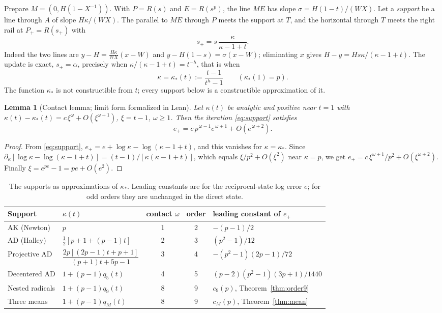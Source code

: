 \documentclass[10pt,a4paper]{article}
\theoremstyle{plain}
\newtheorem{lemma}[theorem]{Lemma}
\theoremstyle{remark}
\numberwithin{equation}{section}
\begin{document}
Prepare $M=(0,H(1-X^{-1}))$. With $P=R(s)$ and $E=R(s^{p})$, the line $ME$ has slope
$\sigma=H(1-t)/(WX)$. Let a \emph{support} be a line through $A$ of slope $H\kappa/(WX)$. The parallel
to $ME$ through $P$ meets the support at $T$, and the horizontal through $T$ meets the right rail at
$P_+=R(s_+)$ with
\begin{equation}\label{eq:support}
s_+=s\,\frac{\kappa}{\kappa-1+t}.
\end{equation}
Indeed the two lines are $y-H=\tfrac{H\kappa}{WX}(x-W)$ and $y-H(1-s)=\sigma(x-W)$; eliminating $x$
gives $H-y=Hs\kappa/(\kappa-1+t)$. The update is exact, $s_+=\alpha$, precisely when
$\kappa/(\kappa-1+t)=t^{-h}$, that is when
\begin{equation}\label{eq:kstar}
\kappa=\kappa_*(t):=\frac{t-1}{t^{h}-1}\qquad(\kappa_*(1)=p).
\end{equation}
The function $\kappa_*$ is not constructible from $t$; every support below is a constructible
approximation of it.

\begin{lemma}[Contact lemma; limit form formalized in Lean]\label{lem:contact}
Let $\kappa(t)$ be analytic and positive near $t=1$ with
$\kappa(t)-\kappa_*(t)=c\,\xi^{\omega}+O(\xi^{\omega+1})$, $\xi=t-1$, $\omega\ge1$. Then the iteration
\eqref{eq:support} satisfies
\[ e_+=c\,p^{\,\omega-1}e^{\,\omega+1}+O(e^{\,\omega+2}). \]
\end{lemma}
\begin{proof}
From \eqref{eq:support}, $e_+=e+\log\kappa-\log(\kappa-1+t)$, and this vanishes for
$\kappa=\kappa_*$. Since $\partial_\kappa[\log\kappa-\log(\kappa-1+t)]=(t-1)/[\kappa(\kappa-1+t)]$,
which equals $\xi/p^{2}+O(\xi^{2})$ near $\kappa=p$, we get
$e_+=c\,\xi^{\omega+1}/p^{2}+O(\xi^{\omega+2})$. Finally $\xi=e^{pe}-1=pe+O(e^{2})$.
\end{proof}

\begin{table}[h]
\centering\small
\caption{The supports as approximations of $\kappa_*$. Leading constants are for the reciprocal-state
log error $e$; for odd orders they are unchanged in the direct state.}\label{tab:supports}
\begin{tabular}{@{}llccl@{}}
\toprule
Support & $\kappa(t)$ & contact $\omega$ & order & leading constant of $e_+$\\
\midrule
AK (Newton) & $p$ & 1 & 2 & $-(p-1)/2$\\[2pt]
AD (Halley) & $\tfrac12[p+1+(p-1)t]$ & 2 & 3 & $(p^{2}-1)/12$\\[2pt]
Projective AD & $\dfrac{2p[(2p-1)t+p+1]}{(p+1)t+5p-1}$ & 3 & 4 & $-(p^{2}-1)(2p-1)/72$\\[6pt]
Decentered AD & $1+(p-1)q_5(t)$ & 4 & 5 & $(p-2)(p^{2}-1)(3p+1)/1440$\\[2pt]
Nested radicals & $1+(p-1)q_9(t)$ & 8 & 9 & $c_9(p)$, Theorem~\ref{thm:order9}\\[2pt]
Three means & $1+(p-1)q_M(t)$ & 8 & 9 & $c_M(p)$, Theorem~\ref{thm:mean}\\
\bottomrule
\end{tabular}
\end{table}
\end{document}
